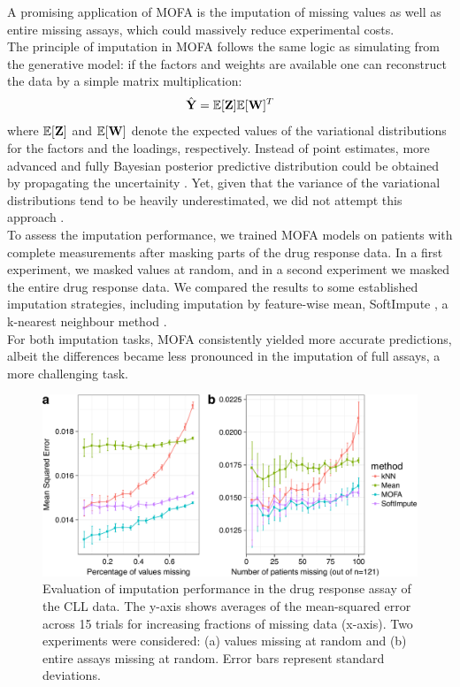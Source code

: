 A promising application of MOFA is the imputation of missing values as well as entire missing assays, which could massively reduce experimental costs.\\
The principle of imputation in MOFA follows the same logic as simulating from the generative model: if the factors and weights are available one can reconstruct the data by a simple matrix multiplication:
\[
	\hat{{\bf Y}} = \mathbb{E}[{\bf Z}] \mathbb{E}[{\bf W}]^T
\]
where $\mathbb{E}[{\bf Z}]$ and $\mathbb{E}[{\bf W}]$ denote the expected values of the variational distributions for the factors and the loadings, respectively. Instead of point estimates, more advanced and fully Bayesian posterior predictive distribution could be obtained by propagating the uncertainity \cite{XX}. Yet, given that the variance of the variational distributions tend to be heavily underestimated, we did not attempt this approach \cite{XX}.\\

To assess the imputation performance, we trained MOFA models on patients with complete measurements after masking parts of the drug response data. In a first experiment, we masked values at random, and in a second experiment we masked the entire drug response data. 
We compared the results to some established imputation strategies, including imputation by feature-wise mean, SoftImpute \cite{Mazumder2010}, a k-nearest neighbour method \cite{Troyanskaya2001}.\\

For both imputation tasks, MOFA consistently yielded more accurate predictions, albeit the differences became less pronounced in the imputation of full assays, a more challenging task.

\begin{figure}[H]
	\centering 	
	\includegraphics[width=1.0\textwidth]{MOFA_imputation}
	\caption{Evaluation of imputation performance in the drug response assay of the CLL data. The y-axis shows averages of the mean-squared error across 15 trials for increasing fractions of missing data (x-axis). Two experiments were considered: (a) values missing at random and (b) entire assays missing at random. Error bars represent standard deviations.}
	\label{fig:MOFA_imputation}
\end{figure}

